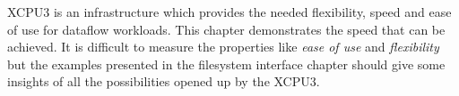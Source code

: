 XCPU3 is an infrastructure which provides the needed flexibility, speed and 
ease of use for dataflow workloads.  This chapter demonstrates the speed that
can be achieved.  It is difficult to measure the properties like \textit{ease of
use} and \textit{flexibility} but the examples presented in the filesystem
interface chapter should give some insights of all the possibilities opened up
by the XCPU3.




